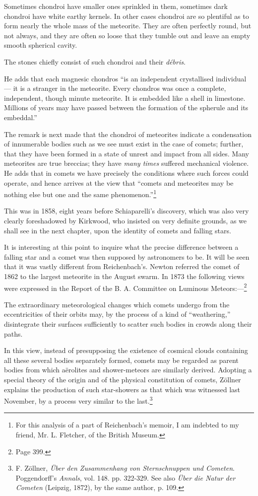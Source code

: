 \documentclass[a4paper, 12pt, oneside, polutonikogreek, english]{article}
\begin{document}
Sometimes chondroi have smaller ones sprinkled in them, sometimes dark chondroi have white earthy kernels. In other cases chondroi are so plentiful as to form nearly the whole mass of the meteorite. They are often perfectly round, but not always, and they are often so loose that they tumble out and leave an empty smooth spherical cavity.

The stones chiefly consist of such chondroi and their \emph{débris}.

He adds that each magnesic chondros ``is an independent crystallised individual --- it is a stranger in the meteorite. Every chondros was once a complete, independent, though minute meteorite. It is embedded like a shell in limestone. Millions of years may have passed between the formation of the spherule and its embeddal.''

The remark is next made that the chondroi of meteorites indicate a condensation of innumerable bodies such as we see must exist in the case of comets; further, that they have been formed in a state of unrest and impact from all sides. Many meteorites are true breccias; they have \emph{many times} suffered mechanical violence. He adds that in comets we have precisely the conditions where such forces could operate, and hence arrives at the view that ``comets and meteorites may be nothing else but one and the same phenomenon.''\footnote{For this analysis of a part of Reichenbach's memoir, I am indebted to my friend, Mr. L. Fletcher, of the British Museum.}

This was in 1858, eight years before Schiaparelli's discovery, which was also very clearly foreshadowed by Kirkwood, who insisted on very definite grounds, as we shall see in the next chapter, upon the identity of comets and falling stars.

It is interesting at this point to inquire what the precise difference between a falling star and a comet was then supposed by astronomers to be. It will be seen that it was vastly different from Reichenbach's. Newton referred the comet of 1862 to the largest meteorite in the August swarm. In 1873 the following views were expressed in the Report of the B. A. Committee on Luminous Meteors:---\footnote{Page 399.}

The extraordinary meteorological changes which comets undergo from the eccentricities of their orbits may, by the process of a kind of ``weathering,'' disintegrate their surfaces sufficiently to scatter such bodies in crowds along their paths.

In this view, instead of presupposing the existence of cosmical clouds containing all these several bodies separately formed, comets may be regarded as parent bodies from which aërolites and shower-meteors are similarly derived. Adopting a special theory of the origin and of the physical constitution of comets, Zöllner explains the production of such star-showers as that which was witnessed last November, by a process very similar to the last.\footnote{F. Zöllner, \emph{Über den Zusammenhang von Sternschnuppen und Cometen}. Poggendorff's \emph{Annals}, vol. 148. pp. 322-329. See also \emph{Über die Natur der Cometen} (Leipzig, 1872), by the same author, p. 109.}
\end{document}

